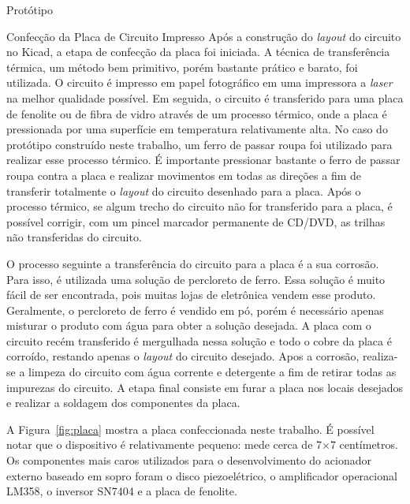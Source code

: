 \begin{chapter}{Protótipo}
\begin{section}{Confecção da Placa de Circuito Impresso}
Após a construção do \textit{layout} do circuito no Kicad, a etapa de confecção da
placa foi iniciada. A técnica de transferência térmica, um método bem primitivo,
porém bastante prático e barato, foi utilizada. O circuito é impresso em papel
fotográfico em uma impressora a \textit{laser} na melhor qualidade possível. Em
seguida, o circuito é transferido para uma placa de fenolite ou de fibra de
vidro através de um processo térmico, onde a placa é pressionada por uma
superfície em temperatura relativamente alta. No caso do protótipo construído
neste trabalho, um ferro de passar roupa foi utilizado para realizar esse
processo térmico. É importante pressionar bastante o ferro de passar roupa
contra a placa e realizar movimentos em todas as direções a fim de transferir
totalmente o \textit{layout} do circuito desenhado para a placa. Após o processo
térmico, se algum trecho do circuito não for transferido para a placa, é
possível corrigir, com um pincel marcador permanente de CD/DVD, as trilhas não
transferidas do circuito. 

O processo seguinte a transferência do circuito para a placa é a sua corrosão.
Para isso, é utilizada uma solução de percloreto de ferro. Essa solução é
muito fácil de ser encontrada, pois muitas lojas de eletrônica vendem esse
produto. Geralmente, o percloreto de ferro é vendido em pó, porém é necessário
apenas misturar o produto com água para obter a solução desejada. A placa com o
circuito recém transferido é mergulhada nessa solução e todo o cobre da placa é
corroído, restando apenas o \textit{layout} do circuito desejado. Apos a
corrosão, realiza-se a limpeza do circuito com água corrente e detergente a
fim de retirar todas as impurezas do circuito. A etapa final consiste em furar a
placa nos locais desejados e realizar a soldagem dos componentes da placa.


A Figura~\ref{fig:placa} mostra a placa confeccionada neste trabalho. É possível
notar que o dispositivo é relativamente pequeno: mede cerca de 7$\times$7
centímetros. Os componentes mais caros utilizados para o desenvolvimento do
acionador externo baseado em sopro foram o disco piezoelétrico, o amplificador
operacional LM358, o inversor SN7404 e a placa de fenolite. 


\end{section}
\end{chapter}
